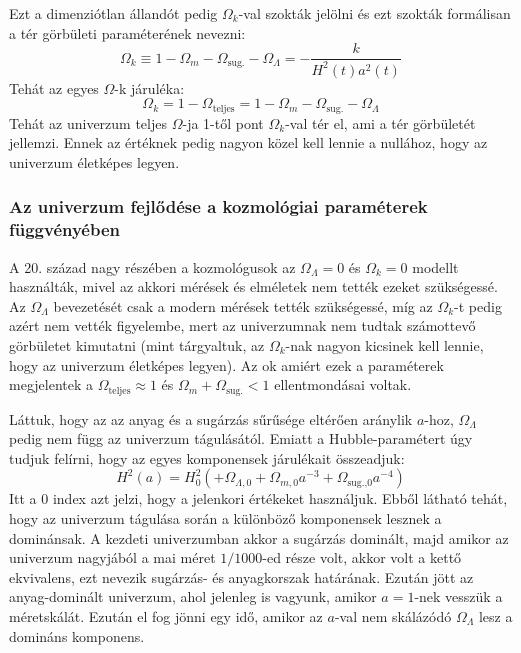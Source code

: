 \documentclass[../main.tex]{subfiles}
\begin{document}
Ezt a dimenziótlan állandót pedig $\Omega_k$-val szokták jelölni és ezt szokták formálisan a tér görbületi paraméterének nevezni:
\begin{equation}
    \Omega_k \equiv 1 - \Omega_m - \Omega_\text{sug.} - \Omega_\Lambda = - \frac{k}{H^2(t) a^2(t)}
\end{equation}
Tehát az egyes $\Omega$-k járuléka:
\begin{equation}
    \Omega_k = 1 - \Omega_\text{teljes} = 1 - \Omega_m - \Omega_\text{sug.} - \Omega_\Lambda
\end{equation}
Tehát az univerzum teljes $\Omega$-ja 1-től pont $\Omega_k$-val tér el, ami a tér görbületét jellemzi. Ennek az értéknek pedig nagyon közel kell lennie a nullához, hogy az univerzum életképes legyen.

\subsubsection{Az univerzum fejlődése a kozmológiai paraméterek függvényében}
A 20. század nagy részében a kozmológusok az $\Omega_\Lambda = 0$ és $\Omega_k = 0$ modellt használták, mivel az akkori mérések és elméletek nem tették ezeket szükségessé. Az $\Omega_\Lambda$ bevezetését csak a modern
mérések tették szükségessé, míg az $\Omega_k$-t pedig azért nem vették figyelembe, mert az univerzumnak nem tudtak számottevő görbületet kimutatni (mint tárgyaltuk, az $\Omega_k$-nak nagyon kicsinek kell lennie, hogy az univerzum életképes legyen).
Az ok amiért ezek a paraméterek megjelentek a $\Omega_\text{teljes} \approx 1$ és $\Omega_m + \Omega_\text{sug.} < 1$ ellentmondásai voltak.

Láttuk, hogy az az anyag és a sugárzás sűrűsége eltérően aránylik $a$-hoz, $\Omega_\Lambda$ pedig nem függ az univerzum tágulásától. Emiatt a Hubble-paramétert úgy tudjuk felírni, hogy az egyes komponensek járulékait összeadjuk:
\begin{equation}
    H^2(a) = H^2_0 \left(+ \Omega_{\Lambda,0} + \Omega_{m,0} a^{-3} + \Omega_{\text{sug.,0}} a^{-4}\right)
\end{equation}
Itt a 0 index azt jelzi, hogy a jelenkori értékeket használjuk. Ebből látható tehát, hogy az univerzum tágulása során a különböző komponensek lesznek a dominánsak.
A kezdeti univerzumban akkor a sugárzás dominált, majd amikor az univerzum nagyjából a mai méret $1/1000$-ed része volt, akkor volt a kettő ekvivalens, ezt nevezik sugárzás- és anyagkorszak határának.
Ezután jött az anyag-dominált univerzum, ahol jelenleg is vagyunk, amikor $a = 1$-nek vesszük a méretskálát. Ezután el fog jönni egy idő, amikor az $a$-val nem skálázódó $\Omega_\Lambda$ lesz a domináns komponens.
\end{document}
